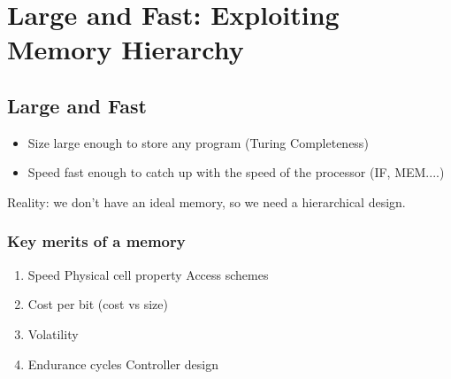 \newpage
\section{Large and Fast: Exploiting Memory Hierarchy}
\subsection{Large and Fast}
\begin{itemize}\small
    \item Size large enough to store any program (Turing Completeness)
    \item Speed fast enough to catch up with the speed of the processor (IF, MEM....)
\end{itemize}

Reality: we don’t have an ideal memory, so we need a hierarchical design. 

\subsubsection{Key merits of a memory}
\begin{enumerate}\small
    \item Speed
    \subitem Physical cell property
    \subitem Access schemes
    \item Cost per bit (cost vs size)
    \item Volatility
    \item Endurance cycles
    \subitem Controller design
\end{enumerate}

